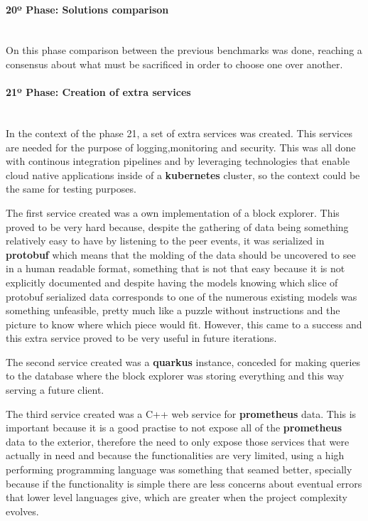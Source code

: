 \paragraph{20º Phase: Solutions comparison}\mbox{}\\
On this phase comparison between the previous benchmarks was done, reaching a consensus about what must be sacrificed in order to choose one over another.

\paragraph{21º Phase: Creation of extra services}\mbox{}\\
In the context of the phase 21, a set of extra services was created. This services are needed for the purpose of logging,monitoring and security. This was all done with continous integration pipelines and by leveraging technologies that enable cloud native applications inside of a \textbf{kubernetes} cluster, so the context could be the same for testing purposes.

The first service created was a own implementation of a block explorer. This proved to be very hard because, despite the gathering of data being something relatively easy to have by listening to the peer events, it was serialized in \textbf{protobuf} which means that the molding of the data should be uncovered to see in a human readable format, something that is not that easy because it is not explicitly documented and despite having the models knowing which slice of protobuf serialized data corresponds to one of the numerous existing models was something unfeasible, pretty much like a puzzle without instructions and the picture to know where which piece would fit. However, this came to a success and this extra service proved to be very useful in future iterations.

The second service created was a \textbf{quarkus} instance, conceded for making queries to the database where the block explorer was storing everything and this way serving a future client.

The third service created was a C++ web service for \textbf{prometheus} data. This is important because it is a good practise to not expose all of the \textbf{prometheus} data to the exterior, therefore the need to only expose those services that were actually in need and because the functionalities are very limited, using a high performing programming language was something that seamed better, specially because if the functionality is simple there are less concerns about eventual errors that lower level languages give, which are greater when the project complexity evolves.

